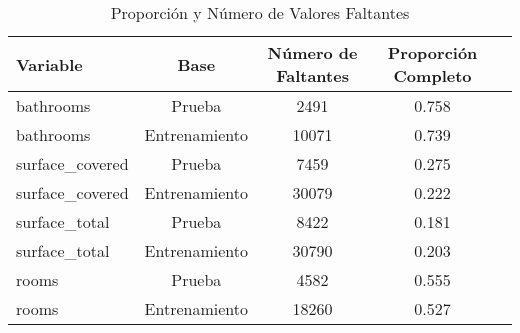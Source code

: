 \begin{table}[h!]
\centering
\begin{tabular}{lcccc}
\toprule
\textbf{Variable} & \textbf{Base} & \textbf{Número de Faltantes} & \textbf{Proporción Completo} \\
\midrule
bathrooms & Prueba & 2491 & 0.758 \\
bathrooms & Entrenamiento & 10071 & 0.739 \\
surface\_covered & Prueba & 7459 & 0.275 \\
surface\_covered & Entrenamiento & 30079 & 0.222 \\
surface\_total & Prueba & 8422 & 0.181 \\
surface\_total & Entrenamiento & 30790 & 0.203 \\
rooms & Prueba & 4582 & 0.555 \\
rooms & Entrenamiento & 18260 & 0.527 \\
\bottomrule
\end{tabular}
\caption{Proporción y Número de Valores Faltantes}
\label{tab:missing_values}
\end{table}
